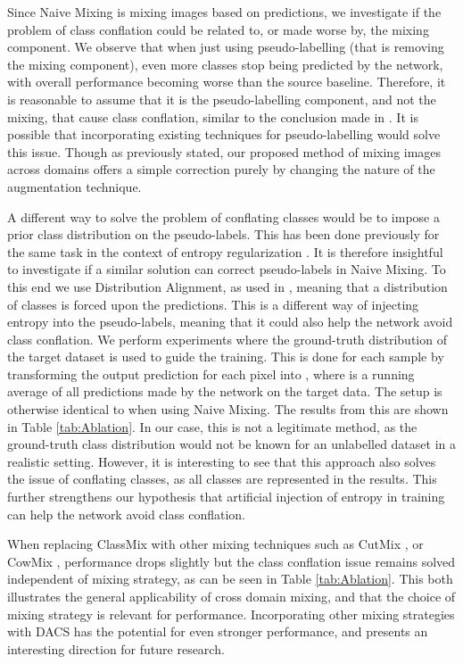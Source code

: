\documentclass[10pt,twocolumn,letterpaper]{article}
\begin{document}
Since Naive Mixing is mixing images based on predictions, we investigate if the problem of class conflation could be related to, or made worse by, the mixing component. 
We observe that when just using pseudo-labelling (that is removing the mixing component), even more classes stop being predicted by the network, with overall performance becoming worse than the source baseline. Therefore, it is reasonable to assume that it is the pseudo-labelling component, and not the mixing, that cause class conflation, similar to the conclusion made in \cite{zou2018domain}. It is possible that incorporating existing techniques for pseudo-labelling would solve this issue. Though as previously stated, our proposed method of mixing images across domains offers a simple correction purely by changing the nature of the augmentation technique.

A different way to solve the problem of conflating classes would be to impose a prior class distribution on the pseudo-labels. This has been done previously for the same task in the context of entropy regularization \cite{vu2018advent}. It is therefore insightful to investigate if a similar solution can correct pseudo-labels in Naive Mixing. To this end we use Distribution Alignment, as used in \cite{ReMixMatch}, meaning that a distribution of classes is forced upon the predictions. This is a different way of injecting entropy into the pseudo-labels, meaning that it could also help the network avoid class conflation.
We perform experiments where the ground-truth distribution  of the target dataset is used to guide the training. This is done for each sample by transforming the output prediction  for each pixel into , where  is a running average of all predictions made by the network on the target data. 
The setup is otherwise identical to when using Naive Mixing. The results from this are shown in Table \ref{tab:Ablation}. In our case, this is not a legitimate method, as the ground-truth class distribution would not be known for an unlabelled dataset in a realistic setting. However, it is interesting to see that this approach also solves the issue of conflating classes, as all classes are represented in the results. This further strengthens our hypothesis that artificial injection of entropy in training can help the network avoid class conflation. 

When replacing ClassMix \cite{ClassMix} with other mixing techniques such as CutMix \cite{CutMix}, or CowMix \cite{MilkingCowMask}, performance drops slightly but the class conflation issue remains solved independent of mixing strategy, as can be seen in Table \ref{tab:Ablation}. This both illustrates the general applicability of cross domain mixing, and that the choice of mixing strategy is relevant for performance. Incorporating other mixing strategies with DACS has the potential for even stronger performance, and presents an interesting direction for future research.
\end{document}
